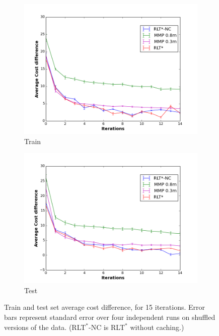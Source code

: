 \documentclass[a4paper,11pt]{report}
\begin{document}
\begin{figure}[tbh]
	\centering
      \begin{subfigure}[b]{0.45\columnwidth}

    \includegraphics[clip=true,width=1.\textwidth]{figures/cost_diff_train.png}
    \caption{Train}
    \label{fig:train_results}
  \end{subfigure}
  \begin{subfigure}[b]{0.45\columnwidth}
    \includegraphics[clip=true,width=1.\textwidth]{figures/cost_diff_val.png}
    \caption{Test}
    \label{fig:test_results}
  \end{subfigure} 

  \caption[Train and test set average cost difference, for 15 iterations.]{Train and test set average cost difference, for 15 iterations. Error bars represent standard error over four independent runs on shuffled versions of the data. (RLT$^*$-NC is RLT$^*$ without caching.)}
  \label{fig:results}
\end{figure}
\end{document}

